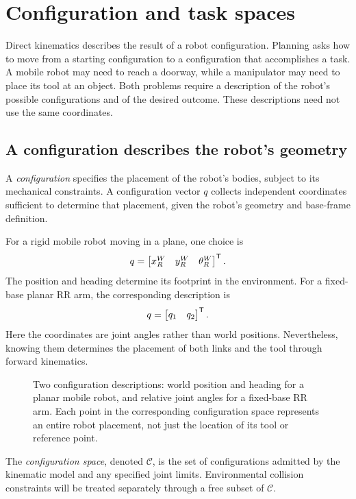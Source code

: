 \chapter{Configuration and task spaces}
\label{chap:lecture11}
Direct kinematics describes the result of a robot configuration. Planning
asks how to move from a starting configuration to a configuration that
accomplishes a task. A mobile robot may need to reach a doorway, while a
manipulator may need to place its tool at an object. Both problems require
a description of the robot's possible configurations and of the desired
outcome. These descriptions need not use the same coordinates.

\section{A configuration describes the robot's geometry}
A \emph{configuration} specifies the placement of the robot's bodies,
subject to its mechanical constraints. A configuration vector $q$ collects
independent coordinates sufficient to determine that placement, given the
robot's geometry and base-frame definition.

For a rigid mobile robot moving in a plane, one choice is
\[
 q=\begin{bmatrix}x_R^W&y_R^W&\theta_R^W\end{bmatrix}^{\mathsf T}.
\]
The position and heading determine its footprint in the environment.
For a fixed-base planar RR arm, the corresponding description is
\[
 q=\begin{bmatrix}q_1&q_2\end{bmatrix}^{\mathsf T}.
\]
Here the coordinates are joint angles rather than world positions.
Nevertheless, knowing them determines the placement of both links and
the tool through forward kinematics.

\begin{figure}[htbp]
\centering
\caption{Two configuration descriptions: world position and heading for
a planar mobile robot, and relative joint angles for a fixed-base RR arm.
Each point in the corresponding configuration space represents an entire
robot placement, not just the location of its tool or reference point.}
\label{fig:l11-configurations}
\end{figure}

The \emph{configuration space}, denoted $\mathcal C$, is the set of
configurations admitted by the kinematic model and any specified joint
limits. Environmental collision constraints will be treated separately
through a free subset of $\mathcal C$.

